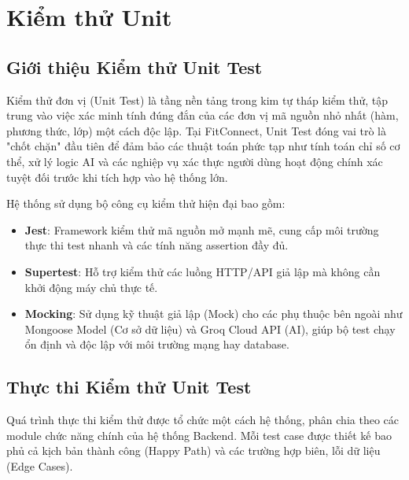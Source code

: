 \section{Kiểm thử Unit}
\label{sec:test_unit}

\subsection{Giới thiệu Kiểm thử Unit Test}
Kiểm thử đơn vị (Unit Test) là tầng nền tảng trong kim tự tháp kiểm thử, tập trung vào việc xác minh tính đúng đắn của các đơn vị mã nguồn nhỏ nhất (hàm, phương thức, lớp) một cách độc lập. Tại FitConnect, Unit Test đóng vai trò là "chốt chặn" đầu tiên để đảm bảo các thuật toán phức tạp như tính toán chỉ số cơ thể, xử lý logic AI và các nghiệp vụ xác thực người dùng hoạt động chính xác tuyệt đối trước khi tích hợp vào hệ thống lớn.

Hệ thống sử dụng bộ công cụ kiểm thử hiện đại bao gồm:
\begin{itemize}
    \item \textbf{Jest}: Framework kiểm thử mã nguồn mở mạnh mẽ, cung cấp môi trường thực thi test nhanh và các tính năng assertion đầy đủ.
    \item \textbf{Supertest}: Hỗ trợ kiểm thử các luồng HTTP/API giả lập mà không cần khởi động máy chủ thực tế.
    \item \textbf{Mocking}: Sử dụng kỹ thuật giả lập (Mock) cho các phụ thuộc bên ngoài như Mongoose Model (Cơ sở dữ liệu) và Groq Cloud API (AI), giúp bộ test chạy ổn định và độc lập với môi trường mạng hay database.
\end{itemize}

\subsection{Thực thi Kiểm thử Unit Test}
Quá trình thực thi kiểm thử được tổ chức một cách hệ thống, phân chia theo các module chức năng chính của hệ thống Backend. Mỗi test case được thiết kế bao phủ cả kịch bản thành công (Happy Path) và các trường hợp biên, lỗi dữ liệu (Edge Cases). 

